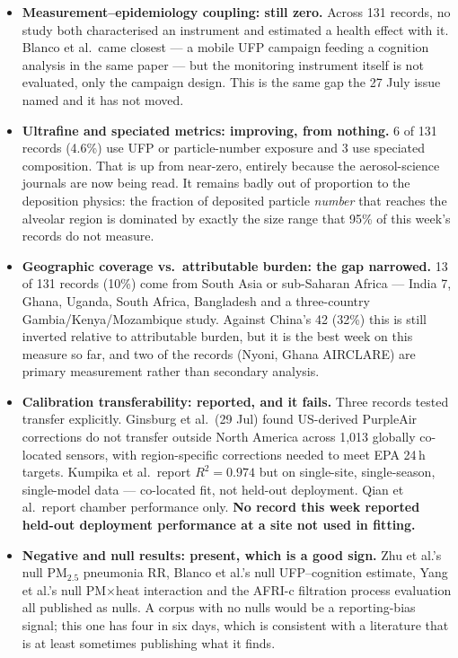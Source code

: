 \documentclass[10pt]{article}
\begin{document}
\footnotesize
\begin{itemize}\setlength{\itemsep}{1.4mm}
\item \textbf{Measurement--epidemiology coupling: still zero.} Across 131 records, no
study both characterised an instrument and estimated a health effect with it. Blanco
et al.\ came closest --- a mobile UFP campaign feeding a cognition analysis in the same
paper --- but the monitoring instrument itself is not evaluated, only the campaign design.
This is the same gap the 27 July issue named and it has not moved.

\item \textbf{Ultrafine and speciated metrics: improving, from nothing.} 6 of 131 records
(4.6\%) use UFP or particle-number exposure and 3 use speciated composition. That is up
from near-zero, entirely because the aerosol-science journals are now being read. It
remains badly out of proportion to the deposition physics: the fraction of deposited
particle \emph{number} that reaches the alveolar region is dominated by exactly the size
range that 95\% of this week's records do not measure.

\item \textbf{Geographic coverage vs.\ attributable burden: the gap narrowed.} 13 of 131
records (10\%) come from South Asia or sub-Saharan Africa --- India 7, Ghana, Uganda,
South Africa, Bangladesh and a three-country Gambia/Kenya/Mozambique study. Against
China's 42 (32\%) this is still inverted relative to attributable burden, but it is the
best week on this measure so far, and two of the records (Nyoni, Ghana AIRCLARE) are
primary measurement rather than secondary analysis.

\item \textbf{Calibration transferability: reported, and it fails.} Three records tested
transfer explicitly. Ginsburg et al.\ (29 Jul) found US-derived PurpleAir corrections do
not transfer outside North America across 1{,}013 globally co-located sensors, with
region-specific corrections needed to meet EPA 24\,h targets. Kumpika et al.\ report
$R^2 = 0.974$ but on single-site, single-season, single-model data --- co-located fit, not
held-out deployment. Qian et al.\ report chamber performance only. \textbf{No record this
week reported held-out deployment performance at a site not used in fitting.}

\item \textbf{Negative and null results: present, which is a good sign.} Zhu et al.'s null
PM$_{2.5}$ pneumonia RR, Blanco et al.'s null UFP--cognition estimate, Yang et al.'s null
PM$\times$heat interaction and the AFRI-c filtration process evaluation all published as
nulls. A corpus with no nulls would be a reporting-bias signal; this one has four in six
days, which is consistent with a literature that is at least sometimes publishing what it
finds.
\end{itemize}
\end{document}
